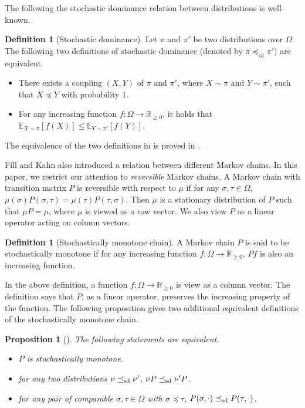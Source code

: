 \documentclass[11pt,a4paper]{article}
\newcommand{\sd}{\preceq_{\textnormal{sd}}}
\newtheorem{proposition}[theorem]{Proposition}
\theoremstyle{definition}
\newtheorem{definition}[theorem]{Definition}
\begin{document}
The following the stochastic dominance relation between distributions is well-known.
\begin{definition}[Stochastic dominance] \label{def:stochastic-dominance}
    Let $\pi$ and $\pi'$ be two distributions over $\Omega$. The following two definitions of stochastic dominance (denoted by $\pi \preceq_{\text{sd}} \pi'$) are equivalent.
    \begin{itemize}
        \item There exists a coupling $(X,Y)$ of $\pi$ and $\pi'$, where $X \sim \pi$ and $Y \sim \pi'$, such that $X \preceq Y$ with probability 1.
        \item For any increasing function $f:\Omega \to \mathbb{R}_{\geq 0}$, it holds that $\mathbb{E}_{X \sim \pi}[f(X)] \leq \mathbb{E}_{Y \sim \pi'}[f(Y)]$.
    \end{itemize}
\end{definition}
The equivalence of the two definitions in  is proved in \cite[Theorem 22.6]{levin2017markov}.

Fill and Kahn \cite{FillK13} also introduced a relation between different Markov chains.
In this paper, we restrict our attention to \emph{reversible} Markov chains.
A Markov chain with transition matrix $P$ is reversible with respect to $\mu$ if for any $\sigma,\tau \in \Omega$, $\mu(\sigma)P(\sigma,\tau) = \mu(\tau)P(\tau,\sigma)$. 
Then $\mu$ is a stationary distribution of $P$ such that $\mu P = \mu$, where $\mu$ is viewed as a row vector. We also view $P$ as a linear operator acting on column vectors.
\begin{definition}[Stochastically monotone chain]\label{def:stochastically-monotone}
A Markov chain $P$ is said to be stochastically monotone if for any increasing function $f:\Omega \to \mathbb{R}_{\geq 0}$, $Pf$ is also an increasing function.
\end{definition}

In the above definition, a function $f:\Omega \to \mathbb{R}_{\geq 0}$ is view as a column vector. The definition says that $P$, as a linear operator, preserves the increasing property of the function.
The following proposition gives two additional equivalent definitions of the stochastically monotone chain.
\begin{proposition}[]\label{prop:stochastically-monotone-equivalent}
    The following statements are equivalent.
\begin{itemize}
        \item $P$ is stochastically monotone.
        \item for any two distributions $\nu \sd \nu'$, $\nu P \sd \nu' P$.
        \item for any pair of comparable $\sigma,\tau \in \Omega$ with $\sigma \preceq \tau$, $P(\sigma,\cdot) \sd P(\tau,\cdot)$.
\end{itemize}
\end{proposition}
\end{document}
